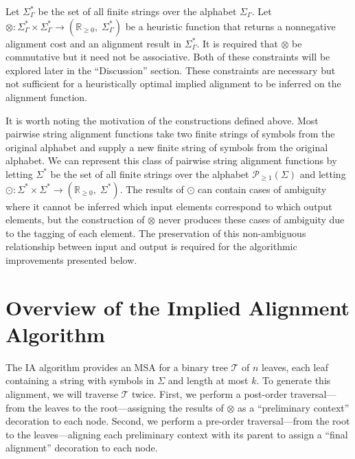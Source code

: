 \documentclass{bmcart}
\newcommand*\NEPowerset{\mathcal{P}_{\geq 1}}
\newcommand*\NonNegReals{\mathbb{R}_{\geq 0}}
\begin{document}
Let $\Sigma^{*}_{\Gamma}$ be the set of all finite strings over the alphabet $\Sigma_{\Gamma}$.
Let $\otimes : \Sigma^{*}_{\Gamma} \times \Sigma^{*}_{\Gamma} \rightarrow \left(\NonNegReals,\; \Sigma^{*}_{\Gamma}\right)$ be a heuristic function that returns a nonnegative alignment cost and an alignment result in $\Sigma^{*}_{\Gamma}$.
It is required that $\otimes$ be commutative but it need not be associative.
Both of these constraints will be explored later in the ``Discussion'' section.
These constraints are necessary but not sufficient for a heuristically optimal implied alignment to be inferred on the alignment function.

It is worth noting the motivation of the constructions defined above. 
Most pairwise string alignment functions take two finite strings of symbols from the original alphabet and supply a new finite string of symbols from the original alphabet.
We can represent this class of pairwise string alignment functions by letting $\Sigma^{*}$ be the set of all finite strings over the alphabet $\NEPowerset (\Sigma)$ and letting $\odot: \Sigma^{*} \times \Sigma^{*} \rightarrow \left(\NonNegReals,\; \Sigma^{*} \right)$.
The results of $\odot$ can contain cases of ambiguity where it cannot be inferred which input elements correspond to which output elements, but the construction of $\otimes$ never produces these cases of ambiguity due to the tagging of each element.
The preservation of this non-ambiguous relationship between input and output is required for the algorithmic improvements presented below.


\section*{Overview of the Implied Alignment Algorithm}

The IA algorithm provides an MSA for a binary tree $\mathcal{T}$ of $n$ leaves, each leaf containing a string with symbols in $\Sigma$ and length at most $k$.
To generate this alignment, we will traverse $\mathcal{T}$ twice.
First, we perform a post-order traversal---from the leaves to the root---assigning the results of $\otimes$ as a ``preliminary context'' decoration to each node.
Second, we perform a pre-order traversal---from the root to the leaves---aligning each preliminary context with its parent to assign a ``final alignment'' decoration to each node.
\end{document}
